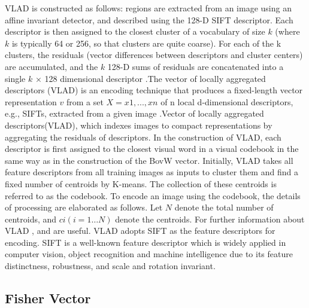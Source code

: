 \documentclass[12pt]{article}
\numberwithin{equation}{section}
\numberwithin{table}{section}
\numberwithin{figure}{section}
\begin{document}
VLAD is constructed as follows: regions are extracted from an image using an affine invariant detector, and described using the 128-D SIFT descriptor. Each descriptor is then assigned to the closest cluster of a vocabulary of size $k$ (where $k$ is typically 64 or 256, so that clusters are quite coarse). For each of the k clusters, the residuals (vector differences between descriptors and cluster centers) are accumulated, and the $k$ 128-D sums of residuals are concatenated into a single $k$ × 128 dimensional descriptor \cite{Arandjelovic2013}.The vector of locally aggregated descriptors (VLAD) is an encoding technique that produces a fixed-length vector representation $v$ from a set $X = {x1, . . . , xn}$ of n local d-dimensional descriptors, e.g., SIFTs, extracted from a given image \cite{Delhumeau2013}.Vector of locally aggregated descriptors(VLAD), which indexes images to compact representations by aggregating the residuals of descriptors. In the construction of VLAD, each descriptor is first assigned to the closest visual word in a visual codebook in the same way as in the construction of the BovW vector\cite{Uchida2013}.
Initially, VLAD takes all feature descriptors from all training images as inputs to cluster them and find a fixed number of centroids by K-means. The collection of these centroids is referred to as the codebook. To encode an image using the codebook, the details of processing are elaborated as follows. Let $N$ denote the total number of centroids, and $ci(i=1…N)$ denote the centroids. For further information about VLAD \cite{Arandjelovic2013}, \cite{Jegou2010} and \cite{Singh2012} are useful. VLAD adopts SIFT as the feature descriptors for encoding. SIFT is a well-known feature descriptor which is widely applied in computer vision, object recognition and machine intelligence due to its feature distinctness, robustness, and scale and rotation invariant\cite{Singh2012}.



\subsection{Fisher Vector} \label{fv}
\end{document}

